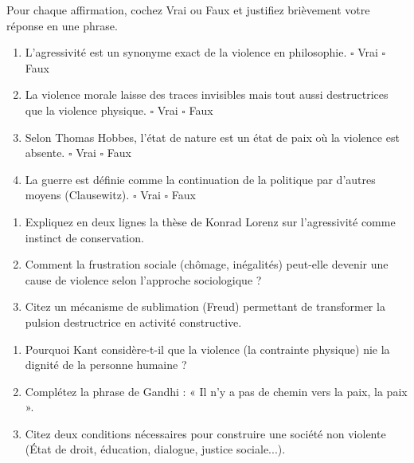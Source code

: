\documentclass[11pt]{article}
\begin{document}
\begin{exercice}
Pour chaque affirmation, cochez Vrai ou Faux et justifiez brièvement votre réponse en une phrase.
\begin{enumerate}
    \item L'agressivité est un synonyme exact de la violence en philosophie. \hfill $\square$ Vrai \quad $\square$ Faux
    \item La violence morale laisse des traces invisibles mais tout aussi destructrices que la violence physique. \hfill $\square$ Vrai \quad $\square$ Faux
    \item Selon Thomas Hobbes, l'état de nature est un état de paix où la violence est absente. \hfill $\square$ Vrai \quad $\square$ Faux
    \item La guerre est définie comme la continuation de la politique par d'autres moyens (Clausewitz). \hfill $\square$ Vrai \quad $\square$ Faux
\end{enumerate}
\end{exercice}

\begin{exercice}
\begin{enumerate}
    \item Expliquez en deux lignes la thèse de Konrad Lorenz sur l'agressivité comme instinct de conservation.
    \item Comment la frustration sociale (chômage, inégalités) peut-elle devenir une cause de violence selon l'approche sociologique ?
    \item Citez un mécanisme de sublimation (Freud) permettant de transformer la pulsion destructrice en activité constructive.
\end{enumerate}
\end{exercice}

\begin{exercice}
\begin{enumerate}
    \item Pourquoi Kant considère-t-il que la violence (la contrainte physique) nie la dignité de la personne humaine ?
    \item Complétez la phrase de Gandhi : « Il n'y a pas de chemin vers la paix, la paix \underline{\hspace{5cm}} ».
    \item Citez deux conditions nécessaires pour construire une société non violente (État de droit, éducation, dialogue, justice sociale...).
\end{enumerate}
\end{exercice}
\end{document}
